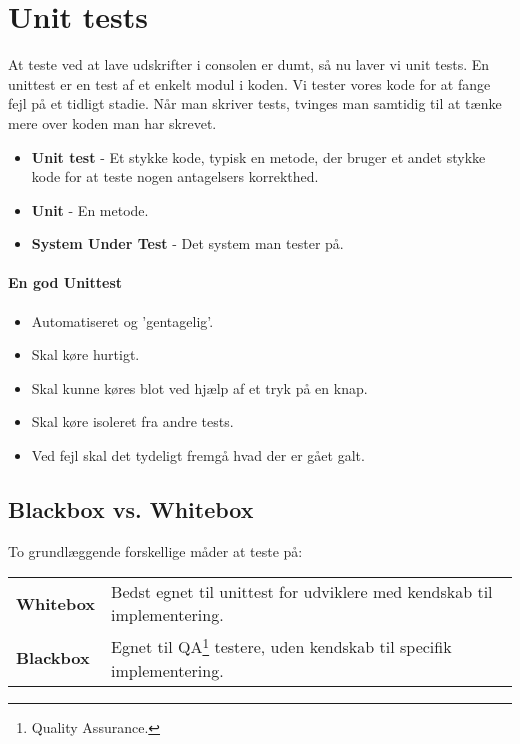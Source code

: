 \section{Unit tests}
At teste ved at lave udskrifter i consolen er dumt, så nu laver vi unit tests. En unittest er en test af et enkelt modul i koden. Vi tester vores kode for at fange fejl på et tidligt stadie. Når man skriver tests, tvinges man samtidig til at tænke mere over koden man har skrevet.

\begin{itemize}
	\item \textbf{Unit test} - Et stykke kode, typisk en metode, der bruger et andet stykke kode for at teste nogen antagelsers korrekthed.
	\item \textbf{Unit} - En metode.
	\item \textbf{System Under Test} - Det system man tester på.
\end{itemize}

\paragraph{En god Unittest}
\begin{itemize}
	\item Automatiseret og 'gentagelig'.
	\item Skal køre hurtigt.
	\item Skal kunne køres blot ved hjælp af et tryk på en knap.
	\item Skal køre isoleret fra andre tests.
	\item Ved fejl skal det tydeligt fremgå hvad der er gået galt.
\end{itemize}

\subsection{Blackbox vs. Whitebox}
To grundlæggende forskellige måder at teste på:

\begin{table}[H]
	\begin{tabular}{ll}
		\textbf{Whitebox} & Bedst egnet til unittest for udviklere med kendskab til implementering.\\
		\textbf{Blackbox} & Egnet til QA\footnote{Quality Assurance.} testere, uden kendskab til specifik implementering.\\
	\end{tabular}
\end{table}


